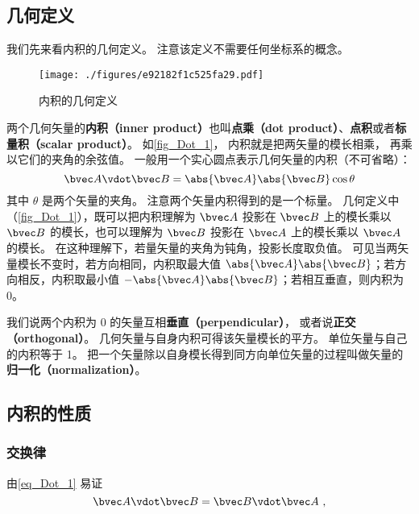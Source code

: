 

\subsection{几何定义}
我们先来看内积的几何定义。 注意该定义不需要任何坐标系的概念。
\begin{figure}[th]
\centering
\texttt{[image: ./figures/e92182f1c525fa29.pdf]}
\caption{内积的几何定义}\label{fig_Dot_1}
\end{figure}

两个几何矢量的\textbf{内积（inner product）}也叫\textbf{点乘（dot product）}、\textbf{点积}或者\textbf{标量积（scalar product）}。 如\autoref{fig_Dot_1}， 内积就是把两矢量的模长相乘， 再乘以它们的夹角的余弦值。 一般用一个实心圆点表示几何矢量的内积（不可省略）：
\begin{equation}\label{eq_Dot_1}
\bvec A \vdot \bvec B = \abs{\bvec A} \abs{\bvec B} \cos\theta 
\end{equation}
其中 $\theta$ 是两个矢量的夹角。 注意两个矢量内积得到的是一个标量。 几何定义中（\autoref{fig_Dot_1}），既可以把内积理解为 $\bvec A$ 投影在 $\bvec B$ 上的模长乘以 $\bvec B$ 的模长，也可以理解为 $\bvec B$ 投影在 $\bvec A$ 上的模长乘以 $\bvec A$ 的模长。 在这种理解下，若量矢量的夹角为钝角，投影长度取负值。 可见当两矢量模长不变时，若方向相同，内积取最大值 $\abs{\bvec A}\abs{\bvec B}$；若方向相反，内积取最小值 $-\abs{\bvec A}\abs{\bvec B}$；若相互垂直，则内积为 0。

我们说两个内积为 0 的矢量互相\textbf{垂直（perpendicular）}， 或者说\textbf{正交（orthogonal）}。 几何矢量与自身内积可得该矢量模长的平方。 单位矢量与自己的内积等于 1。 把一个矢量除以自身模长得到同方向单位矢量的过程叫做矢量的\textbf{归一化（normalization）}。

\subsection{内积的性质}

\subsubsection{交换律}
由\autoref{eq_Dot_1} 易证
\begin{equation}\label{eq_Dot_2}
\bvec A \vdot \bvec B = \bvec B \vdot \bvec A~,
\end{equation}

